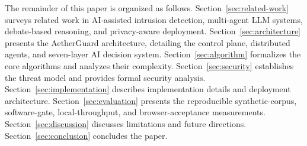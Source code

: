 The remainder of this paper is organized as follows. Section~\ref{sec:related-work} surveys related work in AI-assisted intrusion detection, multi-agent LLM systems, debate-based reasoning, and privacy-aware deployment. Section~\ref{sec:architecture} presents the AetherGuard architecture, detailing the control plane, distributed agents, and seven-layer AI decision system. Section~\ref{sec:algorithm} formalizes the core algorithms and analyzes their complexity. Section~\ref{sec:security} establishes the threat model and provides formal security analysis. Section~\ref{sec:implementation} describes implementation details and deployment architecture. Section~\ref{sec:evaluation} presents the reproducible synthetic-corpus, software-gate, local-throughput, and browser-acceptance measurements. Section~\ref{sec:discussion} discusses limitations and future directions. Section~\ref{sec:conclusion} concludes the paper.

